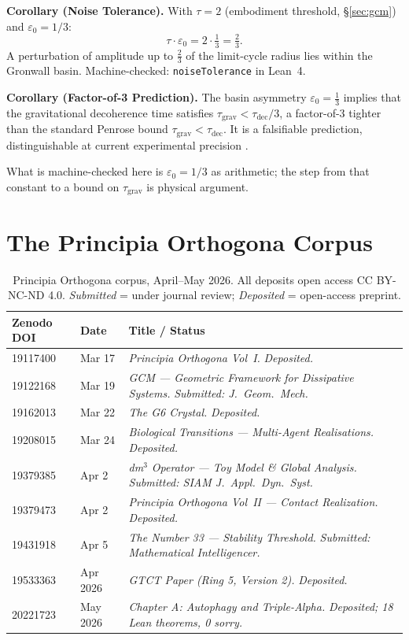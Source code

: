 \documentclass[14pt,a4paper]{extarticle}
\begin{document}
\noindent
\textbf{Corollary (Noise Tolerance).}
With $\tau = 2$ (embodiment threshold, \S\ref{sec:gcm}) and $\varepsilon_0 = 1/3$:
\[
  \tau \cdot \varepsilon_0 = 2 \cdot \tfrac{1}{3} = \tfrac{2}{3}.
\]
A perturbation of amplitude up to $\tfrac{2}{3}$ of the limit-cycle
radius lies within the Gronwall basin.
Machine-checked: \texttt{noiseTolerance} in Lean~4.

\medskip
\noindent
\textbf{Corollary (Factor-of-3 Prediction).}
The basin asymmetry $\varepsilon_0 = \tfrac{1}{3}$ implies that the
gravitational decoherence time satisfies
$\tau_{\mathrm{grav}} < \tau_{\mathrm{dec}}/3$,
a factor-of-3 tighter than the standard Penrose bound $\tau_{\mathrm{grav}} < \tau_{\mathrm{dec}}$.
It is a falsifiable prediction, distinguishable at current experimental
precision \cite[Chap.\,\textbf{$\Psi$}]{AXLE2026}.

What is machine-checked here is $\varepsilon_0 = 1/3$ as arithmetic; the
step from that constant to a bound on $\tau_{\mathrm{grav}}$ is physical
argument.

\section{The Principia Orthogona Corpus}
\label{sec:corpus}

\begin{table}[ht]
\centering
\small
\caption{Principia Orthogona corpus, April--May 2026.
All deposits open access CC BY-NC-ND 4.0.
\emph{Submitted} = under journal review;
\emph{Deposited} = open-access preprint.}
\label{tab:corpus}
\begin{tabularx}{\textwidth}{llX}
\toprule
Zenodo DOI & Date & Title / Status \\
\midrule
19117400 & Mar 17 &
  \textit{Principia Orthogona Vol~I.} \emph{Deposited.} \\
19122168 & Mar 19 &
  \textit{GCM --- Geometric Framework for Dissipative Systems.}
  \emph{Submitted: J.\ Geom.\ Mech.} \\
19162013 & Mar 22 &
  \textit{The G6 Crystal.} \emph{Deposited.} \\
19208015 & Mar 24 &
  \textit{Biological Transitions --- Multi-Agent Realisations.}
  \emph{Deposited.} \\
19379385 & Apr 2 &
  \textit{dm$^3$ Operator --- Toy Model \& Global Analysis.}
  \emph{Submitted: SIAM J.\ Appl.\ Dyn.\ Syst.} \\
19379473 & Apr 2 &
  \textit{Principia Orthogona Vol~II --- Contact Realization.}
  \emph{Deposited.} \\
19431918 & Apr 5 &
  \textit{The Number 33 --- Stability Threshold.}
  \emph{Submitted: Mathematical Intelligencer.} \\
19533363 & Apr 2026 &
  \textit{GTCT Paper (Ring 5, Version 2).} \emph{Deposited.} \\
20221723 & May 2026 &
  \textit{Chapter A: Autophagy and Triple-Alpha.}
  \emph{Deposited; 18 Lean theorems, 0 sorry.} \\
\bottomrule
\end{tabularx}
\end{table}
\end{document}
